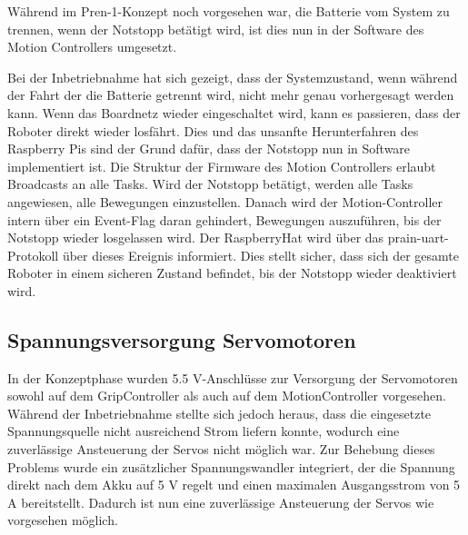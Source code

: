 \documentclass[main.tex]{subfiles} %
\begin{document}
Während im Pren-1-Konzept noch vorgesehen war, die Batterie vom System zu
trennen, wenn der Notstopp betätigt wird, ist dies nun in der Software des
Motion Controllers umgesetzt.

Bei der Inbetriebnahme hat sich gezeigt, dass der Systemzustand, wenn während
der Fahrt der die Batterie getrennt wird, nicht mehr genau vorhergesagt werden
kann. Wenn das Boardnetz wieder eingeschaltet wird, kann es passieren, dass der
Roboter direkt wieder losfährt. Dies und das unsanfte Herunterfahren des
Raspberry Pis sind der Grund dafür, dass der Notstopp nun in Software
implementiert ist. Die Struktur der Firmware des Motion Controllers erlaubt
Broadcasts an alle Tasks. Wird der Notstopp betätigt, werden alle Tasks
angewiesen, alle Bewegungen einzustellen. Danach wird der Motion-Controller
intern über ein Event-Flag daran gehindert, Bewegungen auszuführen, bis der
Notstopp wieder losgelassen wird. Der RaspberryHat wird über das
prain-uart-Protokoll über dieses Ereignis informiert. Dies stellt sicher, dass
sich der gesamte Roboter in einem sicheren Zustand befindet, bis der Notstopp
wieder deaktiviert wird.


\subsection*{Spannungsversorgung Servomotoren}
In der Konzeptphase wurden 5.5 V-Anschlüsse zur Versorgung der Servomotoren sowohl auf dem
GripController als auch auf dem MotionController vorgesehen. Während der Inbetriebnahme stellte sich
jedoch heraus, dass die eingesetzte Spannungsquelle nicht ausreichend Strom liefern konnte, wodurch
eine zuverlässige Ansteuerung der Servos nicht möglich war. Zur Behebung dieses Problems wurde ein
zusätzlicher Spannungswandler integriert, der die Spannung direkt nach dem Akku auf 5 V regelt und
einen maximalen Ausgangsstrom von 5 A bereitstellt. Dadurch ist nun eine zuverlässige Ansteuerung der
Servos wie vorgesehen möglich.
\end{document}
